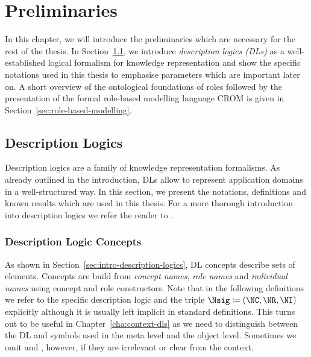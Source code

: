 
\chapter{Preliminaries}
\label{cha:preliminaries}

In this chapter, we will introduce the preliminaries which are necessary for the rest of the thesis.
In Section~\ref{sec:prelim-dls}, we introduce \emph{description logics (DLs)} as a well-established
logical formalism for knowledge representation and show the specific notations used in this thesis
to emphasise parameters which are important later on. A short overview of the ontological
foundations of roles followed by the presentation of the formal role-based modelling language CROM
is given in Section~\ref{sec:role-based-modelling}.

\section{Description Logics}
\label{sec:prelim-dls}

Description logics are a family of knowledge representation formalisms. As already outlined in the
introduction, DLs allow to represent application domains in a well-structured way. In this section,
we present the notations, definitions and known results which are used in this thesis.
%
For a more thorough introduction into description logics we refer the reader to
\cite{DLhandbook-07}.

\subsection{Description Logic Concepts}
\label{sec:dl-concepts}

As shown in Section~\ref{sec:intro-description-logics}, DL concepts describe sets of
elements. Concepts are build from \emph{concept names}, \emph{role names} and \emph{individual
  names} using concept and role constructors.  Note that in the following definitions we refer to
the specific description logic \Lmc and the triple $\Nsig \coloneqq (\NC, \NR, \NI)$ explicitly
although it is usually left implicit in standard definitions.  This turns out to be useful in
Chapter~\ref{cha:context-dls} as we need to distinguish between the DL and symbols used in the meta
level and the object level.  Sometimes we omit \Lmc and \Nsig, however, if they are irrelevant or
clear from the context.

